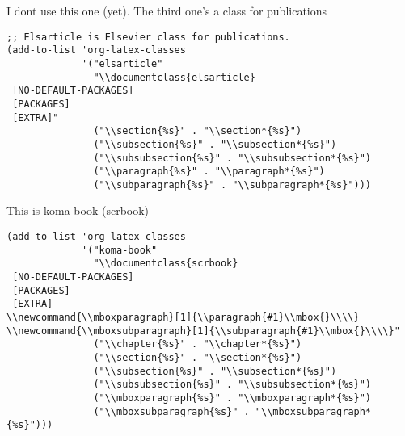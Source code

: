 \documentclass[11pt]{article}
\begin{document}
I dont use this one (yet).
The third one's a class for publications
\begin{verbatim}
;; Elsarticle is Elsevier class for publications.
(add-to-list 'org-latex-classes
             '("elsarticle"
               "\\documentclass{elsarticle}
 [NO-DEFAULT-PACKAGES]
 [PACKAGES]
 [EXTRA]"
               ("\\section{%s}" . "\\section*{%s}")
               ("\\subsection{%s}" . "\\subsection*{%s}")
               ("\\subsubsection{%s}" . "\\subsubsection*{%s}")
               ("\\paragraph{%s}" . "\\paragraph*{%s}")
               ("\\subparagraph{%s}" . "\\subparagraph*{%s}")))
\end{verbatim}
This is koma-book (scrbook)
\begin{verbatim}
(add-to-list 'org-latex-classes
             '("koma-book"
               "\\documentclass{scrbook}
 [NO-DEFAULT-PACKAGES]
 [PACKAGES]
 [EXTRA]
\\newcommand{\\mboxparagraph}[1]{\\paragraph{#1}\\mbox{}\\\\}
\\newcommand{\\mboxsubparagraph}[1]{\\subparagraph{#1}\\mbox{}\\\\}"
               ("\\chapter{%s}" . "\\chapter*{%s}")
               ("\\section{%s}" . "\\section*{%s}")
               ("\\subsection{%s}" . "\\subsection*{%s}")
               ("\\subsubsection{%s}" . "\\subsubsection*{%s}")
               ("\\mboxparagraph{%s}" . "\\mboxparagraph*{%s}")
               ("\\mboxsubparagraph{%s}" . "\\mboxsubparagraph*{%s}")))
\end{verbatim}
\end{document}
